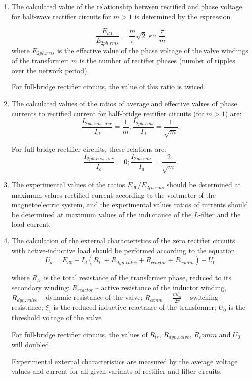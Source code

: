 \documentclass[a4paper,14pt]{article}
\begin{document}
\begin{enumerate}
\item The calculated value of the relationship between rectified and phase voltage for half-wave rectifier circuits
for $m> 1$ is determined by the expression

$$
		\frac{E_{d0}}{E_{2ph.rms}} = \frac{m}{\pi} \sqrt{2}\sin\frac{\pi}{m}
$$
where $E_{2ph.rms}$ is the effective value of the phase voltage of the valve windings of the transformer; 
$m$ is the number of rectifier phases (number of ripples over the network period).

For full-bridge rectifier circuits, the value of this ratio is twiced.

\item The calculated values of the ratios of average and effective values of phase currents to rectified current for
half-bridge rectifier circuits (for $m> 1$) are:
$$
  \frac{I_{2ph.rms\:\:avr}}{I_d} = \frac{1}{m}; \frac{I_{2ph.rms}}{I_d} = \frac{1}{\sqrt{m}}.
$$

For full-bridge rectifier circuits, these relations are:
$$
    \frac{I_{2ph.rms\:\:avr}}{I_d} = 0; \frac{I_{2ph.rms}}{I_d} = \frac{2}{\sqrt{m}}.
$$		


\item The experimental values of the ratios $E_{d0} / E_{2ph.rms}$ should be determined at maximum values
rectified current according to the voltmeter of the magnetoelectric system, and the experimental values
ratios of currents should be determined at maximum values of the inductance of the $L$-filter and the load current.

\item The calculation of the external characteristics of the zero rectifier circuits with active-inductive load 
should be performed according to the equation
$$
		U_d = E_{d0} -I_d\left( R_{tr} + R_{dyn.valve} + R_{reactor} + R_{comm}\right) - U_0
$$

where $R_{tr}$ is the total resistance of the transformer phase, reduced to its secondary winding:
$R_{reactor}$ -- active resistance of the inductor winding, $R_{dyn.valve}$ -- dynamic resistance of the valve;
		${\displaystyle R_{comm}=\frac{m\xi_a}{2\pi}}$ 
-- switching resistance; $\xi_a$ is the reduced inductive reactance of the transformer;
$U_0$ is the threshold voltage of the valve.

For full-bridge rectifier circuits, the values of $R_{tr}$, $R_{dyn.valve}$, $R_comm$ and $U_0$ will doubled.

Experimental external characteristics are measured by the average voltage values
and current for all given variants of rectifier and filter circuits.


\end{enumerate}
\end{document}
